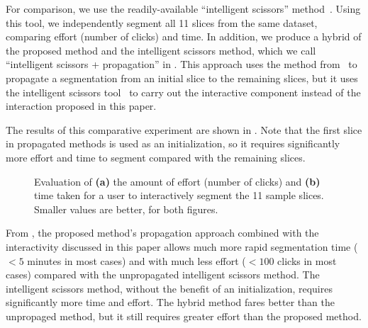 \documentclass[]{spie}  %
\begin{document}
For comparison, we use the readily-available ``intelligent scissors''
method~\cite{mortensen:95}.  Using this tool, we independently segment
all 11 slices from the same dataset, comparing effort (number of
clicks) and time.  In addition, we produce a hybrid of the proposed
method and the intelligent scissors method, which we call
``intelligent scissors + propagation'' in .  This approach
uses the method from~\cite{waggoner:11} to propagate a segmentation
from an initial slice to the remaining slices, but it uses the
intelligent scissors tool~\cite{mortensen:95} to carry out the
interactive component instead of the interaction proposed in this
paper.

The results of this comparative experiment are shown in .
Note that the first slice in propagated methods is used as an
initialization, so it requires significantly more effort and time to
segment compared with the remaining slices.
\begin{figure}[htbp]
\centering
{}
\hspace{0.1em}
\caption{Evaluation of \textbf{(a)} the amount of effort (number of
  clicks) and \textbf{(b)} time taken for a user to interactively
  segment the 11 sample slices.  Smaller values are better, for both
  figures.} \label{fig:ex}
\end{figure}
From , the proposed method's propagation approach combined
with the interactivity discussed in this paper allows much more rapid
segmentation time ($< 5$ minutes in most cases) and with much less
effort ($< 100$ clicks in most cases) compared with the unpropagated
intelligent scissors method.  The intelligent scissors method, without
the benefit of an initialization, requires significantly more time and
effort.  The hybrid method fares better than the unpropaged method,
but it still requires greater effort than the proposed method.
\end{document}
